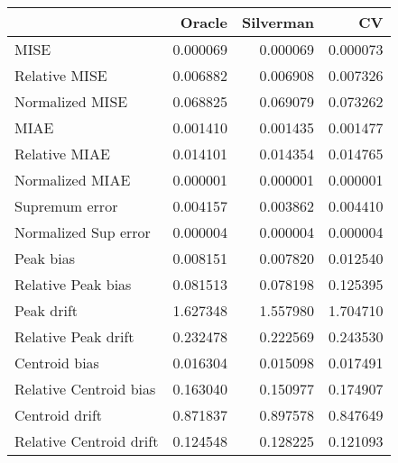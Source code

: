 \begin{tabular}{lrrr}
  \toprule
 & Oracle & Silverman & CV \\ 
  \midrule
MISE & 0.000069 & 0.000069 & 0.000073 \\ 
  Relative MISE & 0.006882 & 0.006908 & 0.007326 \\ 
  Normalized MISE & 0.068825 & 0.069079 & 0.073262 \\ 
  MIAE & 0.001410 & 0.001435 & 0.001477 \\ 
  Relative MIAE & 0.014101 & 0.014354 & 0.014765 \\ 
  Normalized MIAE & 0.000001 & 0.000001 & 0.000001 \\ 
  Supremum error & 0.004157 & 0.003862 & 0.004410 \\ 
  Normalized Sup error & 0.000004 & 0.000004 & 0.000004 \\ 
  Peak bias & 0.008151 & 0.007820 & 0.012540 \\ 
  Relative Peak bias & 0.081513 & 0.078198 & 0.125395 \\ 
  Peak drift & 1.627348 & 1.557980 & 1.704710 \\ 
  Relative Peak drift & 0.232478 & 0.222569 & 0.243530 \\ 
  Centroid bias & 0.016304 & 0.015098 & 0.017491 \\ 
  Relative Centroid bias & 0.163040 & 0.150977 & 0.174907 \\ 
  Centroid drift & 0.871837 & 0.897578 & 0.847649 \\ 
  Relative Centroid drift & 0.124548 & 0.128225 & 0.121093 \\ 
   \bottomrule
\end{tabular}
